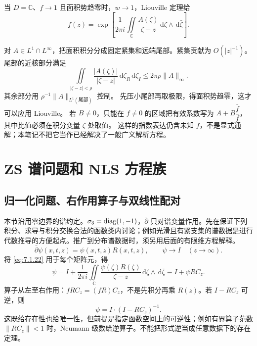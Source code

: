 \documentclass[lang=cn,scheme=chinese,mode=simple,device=normal,color=blue,math=cm,thmcnt=section,12pt]{elegantbook}
\newcommand{\dd}{\,\mathrm{d}}
\newcommand{\eqq}[2]{\tag{#1}\label{eq:#1}#2}
\begin{document}
当 $D=\mathbb C$、$f\to1$ 且面积势趋零时，$w\to1$，Liouville 定理给
\begin{equation}
\eqq{7.1.41}{f(z)=\exp\left[\dfrac{1}{2\pi i}\iint\limits_{\mathbb C}\dfrac{A(\zeta)}{\zeta-z}\dd\zeta\wedge\dd\bar\zeta\right].}
\end{equation}
\begin{callout}
对 $A\in L^1\cap L^\infty$，把面积积分分成固定紧集和远端尾部。紧集贡献为 $O(|z|^{-1})$。尾部的近核部分满足
\[
\iint\limits_{|\zeta-z|<\rho}\dfrac{|A(\zeta)|}{|\zeta-z|}\dd\zeta_R\dd\zeta_I\le2\pi\rho\|A\|_\infty.
\]
其余部分用 $\rho^{-1}\|A\|_{L^1(\text{尾部})}$ 控制。
先压小尾部再取极限，得面积势趋零，这才可以应用 Liouville。
若 $B\ne0$，只能在 $f\ne0$ 的区域把有效系数写为 $A+B\dfrac{\bar f}{f}$，其中比值必须在积分变量 $\zeta$ 处取值。
这样的指数表达仍含未知 $f$，不是显式通解；本笔记不把它当作已经解决了一般广义解析方程。
\end{callout}

\section{ZS 谱问题和 NLS 方程族}
\subsection{归一化问题、右作用算子与双线性配对}
本节沿用零边界的谱约定。$\sigma_3=\operatorname{diag}(1,-1)$，$\bar\partial$ 只对谱变量作用。先在保证下列积分、求导与积分交换合法的函数类内讨论；例如光滑且有紧支集的谱数据是进行代数推导的方便起点。推广到分布谱数据时，须另用后面的有限维方程解释。
\begin{equation}
\eqq{7.2.1}{\bar\partial\psi(x,t,z)=\psi(x,t,z)R(x,t,z),\qquad \psi\to I\quad(z\to\infty).}
\end{equation}
将 \eqref{eq:7.1.22} 用于每个矩阵元，得
\begin{equation}
\eqq{7.2.2}{\psi=I+\dfrac{1}{2\pi i}\iint\limits_{\mathbb C}\dfrac{\psi(\zeta)R(\zeta)}{\zeta-z}\dd\zeta\wedge\dd\bar\zeta
\equiv I+\psi RC_z.}
\end{equation}
算子从左至右作用：$fRC_z=(fR)C_z$，不是先积分再乘 $R(z)$。若 $I-RC_z$ 可逆，则
\begin{equation}
\eqq{7.2.3}{\psi=I\cdot(I-RC_z)^{-1}.}
\end{equation}
这既给存在性也给唯一性，但前提是指定函数空间上的可逆性；例如有界算子范数 $\|RC_z\|<1$ 时，Neumann 级数给逆算子。不能把形式逆当成任意数据下的存在定理。
\end{document}
